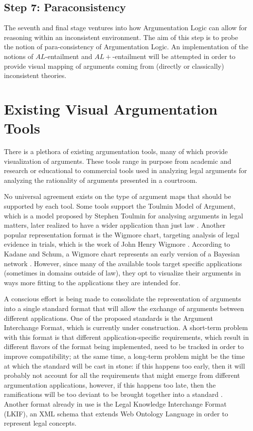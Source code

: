 \documentclass[11pt,twoside,a4paper]{report}
\begin{document}
\subsection{Step 7: Paraconsistency}
The seventh and final stage ventures into how Argumentation Logic can allow for reasoning within an inconsistent environment. The aim of this step is to probe the notion of para-consistency of Argumentation Logic. An implementation of the notions of $AL$-entailment and $AL+$-entailment will be attempted in order to provide visual mapping of arguments coming from (directly or classically) inconsistent theories.

\section{Existing Visual Argumentation Tools}
\label{sec:vizargtools}
There is a plethora of existing argumentation tools, many of which provide visualization of arguments. These tools range in purpose from academic and research or educational to commercial tools used in analyzing legal arguments for analyzing the rationality of arguments presented in a courtroom.

No universal agreement exists on the type of argument maps that should be supported by each tool. Some tools support the Toulmin Model of Argument, which is a model proposed by Stephen Toulmin for analysing arguments in legal matters, later realized to have a wider application than just law \citep*{usesofargument}. Another popular representation format is the Wigmore chart, targeting analysis of legal evidence in trials, which is the work of John Henry Wigmore \citep*[pp. 123-144]{analysisofevidence}. According to Kadane and Schum, a Wigmore chart represents an early version of a Bayesian network \citep*[pp. 66-76]{saccoandvazetti}. However, since many of the available tools target specific applications (sometimes in domains outside of law), they opt to visualize their arguments in ways more fitting to the applications they are intended for.

A conscious effort is being made to consolidate the representation of arguments into a single standard format that will allow the exchange of arguments between different applications. One of the proposed standards is the Argument Interchange Format, which is currently under construction. A short-term problem with this format is that different application-specific requirements, which result in different flavors of the format being implemented, need to be tracked in order to improve compatibility; at the same time, a long-term problem might be the time at which the standard will be cast in stone: if this happens too early, then it will probably not account for all the requirements that might emerge from different argumentation applications, however, if this happens too late, then the ramifications will be too deviant to be brought together into a standard \citep*[p. 401]{argumentationinai}. Another format already in use is the Legal Knowledge Interchange Format (LKIF), an XML schema that extends Web Ontology Language in order to represent legal concepts.
\end{document}
